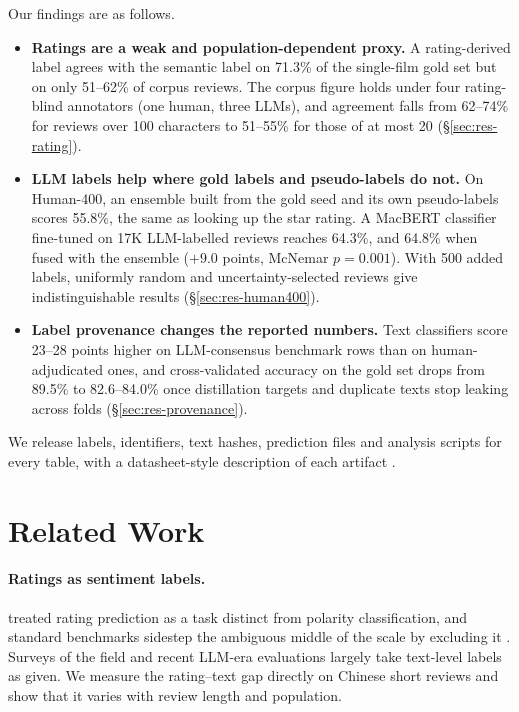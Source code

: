 Our findings are as follows.
\begin{itemize}[leftmargin=*,itemsep=1pt,topsep=2pt]
  \item \textbf{Ratings are a weak and population-dependent proxy.}
        A rating-derived label agrees with the semantic label on
        71.3\% of the single-film gold set but on only 51--62\% of
        corpus reviews. The corpus figure holds under four
        rating-blind annotators (one human, three LLMs), and
        agreement falls from 62--74\% for reviews over 100
        characters to 51--55\% for those of at most 20
        (\S\ref{sec:res-rating}).
  \item \textbf{LLM labels help where gold labels and pseudo-labels
        do not.} On Human-400, an ensemble built from the gold seed
        and its own pseudo-labels scores 55.8\%, the same as looking
        up the star rating. A MacBERT classifier fine-tuned on 17K
        LLM-labelled reviews reaches 64.3\%, and 64.8\% when fused
        with the ensemble ($+9.0$ points, McNemar $p{=}0.001$). With
        500 added labels, uniformly random and uncertainty-selected
        reviews give indistinguishable results
        (\S\ref{sec:res-human400}).
  \item \textbf{Label provenance changes the reported numbers.}
        Text classifiers score 23--28 points higher on LLM-consensus
        benchmark rows than on human-adjudicated ones, and
        cross-validated accuracy on the gold set drops from 89.5\%
        to 82.6--84.0\% once distillation targets and duplicate
        texts stop leaking across folds (\S\ref{sec:res-provenance}).
\end{itemize}
We release labels, identifiers, text hashes, prediction files and
analysis scripts for every table, with a datasheet-style description
of each artifact \citep{gebru2021,bender2018}.

\section{Related Work}
\label{sec:related}

\paragraph{Ratings as sentiment labels.}
\citet{pang2005seeing} treated rating prediction as a task distinct
from polarity classification, and standard benchmarks sidestep the
ambiguous middle of the scale by excluding it
\citep{maas2011,zhang2015char}. Surveys of the field
\citep{pang2008opinion,zhang2018dl} and recent LLM-era evaluations
\citep{zhang2024reality} largely take text-level labels as given. We
measure the rating--text gap directly on Chinese short reviews and
show that it varies with review length and population.

